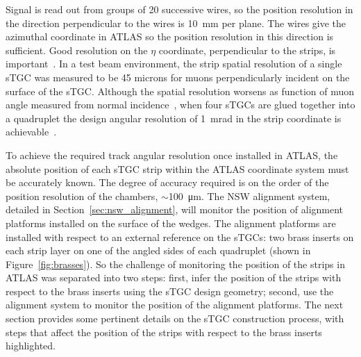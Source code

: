 Signal is read out from groups of 20 successive wires, so the position resolution in the direction perpendicular to the wires is \SI{10}{mm} per plane. The wires give the azimuthal coordinate in ATLAS so the position resolution in this direction is sufficient. Good resolution on the $\eta$ coordinate, perpendicular to the strips, is important~\cite{nsw_tdr}. In a test beam environment, the strip spatial resolution of a single sTGC was measured to be 45 microns for muons perpendicularly incident on the surface of the sTGC.  Although the spatial resolution worsens as function of muon angle measured from normal incidence~\cite{lefebvre_thesis}, when four sTGCs are glued together into a quadruplet the design angular resolution of \SI{1}{mrad} in the strip coordinate is achievable~\cite{nsw_tdr, perez-codina_small-strip_2016}. 

To achieve the required track angular resolution once installed in ATLAS, the absolute position of each sTGC strip within the ATLAS coordinate system must be accurately known. The degree of accuracy required is on the order of the position resolution of the chambers, $\sim$\SI{100}{\micro\meter}. The NSW alignment system, detailed in Section~\ref{sec:nsw_alignment}, will monitor the position of alignment platforms installed on the surface of the wedges. The alignment platforms are installed with respect to an external reference on the sTGCs: two brass inserts on each strip layer on one of the angled sides of each quadruplet (shown in Figure~\ref{fig:brasses}). So the challenge of monitoring the position of the strips in ATLAS was separated into two steps: first, infer the position of the strips with respect to the brass inserts using the sTGC design geometry; second, use the alignment system to monitor the position of the alignment platforms. The next section provides some pertinent details on the sTGC construction process, with steps that affect the position of the strips with respect to the brass inserts highlighted.

